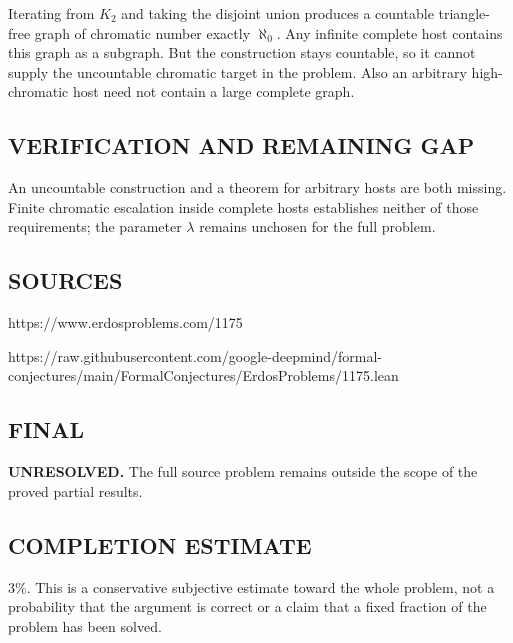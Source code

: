 Iterating from $K_2$ and taking the disjoint union produces a countable
triangle-free graph of chromatic number exactly $\aleph_0$. Any infinite complete
host contains this graph as a subgraph. But the construction stays countable,
so it cannot supply the uncountable chromatic target in the problem. Also an
arbitrary high-chromatic host need not contain a large complete graph.

\subsection*{VERIFICATION AND REMAINING GAP}
An uncountable construction and a theorem for arbitrary hosts are both missing.
Finite chromatic escalation inside complete hosts establishes neither of those
requirements; the parameter $\lambda$ remains unchosen for the full problem.

\subsection*{SOURCES}
https://www.erdosproblems.com/1175

https://raw.githubusercontent.com/google-deepmind/formal-conjectures/main/FormalConjectures/ErdosProblems/1175.lean

\subsection*{FINAL}
\textbf{UNRESOLVED.} The full source problem remains outside the scope of the proved partial results.

\subsection*{COMPLETION ESTIMATE}
$3\%$. This is a conservative subjective estimate toward the whole problem, not a probability that the argument is correct or a claim that a fixed fraction of the problem has been solved.
